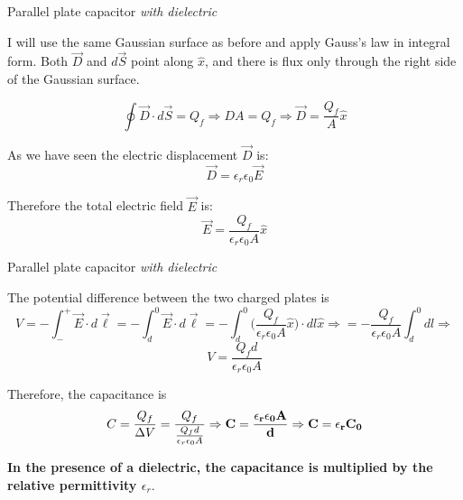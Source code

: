 %
%
%

\begin{frame}{Parallel plate capacitor {\em with dielectric}}

I will use the same Gaussian surface as before and apply Gauss's law in integral form.
Both $\vec{D}$ and $d\vec{S}$ point along $\hat{x}$,
and there is flux only through the right side of the Gaussian surface.

\begin{equation*}
   \oint \vec{D} \cdot d\vec{S} = Q_{f} \Rightarrow D A = Q_{f} \Rightarrow \vec{D} = \frac{Q_{f}}{A} \hat{x}
\end{equation*}

As we have seen the electric displacement $\vec{D}$ is:
\begin{equation*}
   \vec{D} = \epsilon_{r} \epsilon_{0} \vec{E}
\end{equation*}

Therefore the total electric field $\vec{E}$ is:
\begin{equation*}
   \vec{E} = \frac{Q_{f}}{\epsilon_{r} \epsilon_{0} A} \hat{x}
\end{equation*}

\end{frame}

%
%
%

\begin{frame}{Parallel plate capacitor {\em with dielectric}}

The potential difference between the two charged plates is
\begin{equation*}
    V = - \int_{-}^{+} \vec{E} \cdot d\vec{\ell} =  - \int_{d}^{0} \vec{E} \cdot d\vec{\ell}
      = - \int_{d}^{0} \Big( \frac{Q_{f}}{\epsilon_{r} \epsilon_{0} A} \hat{x} \Big) \cdot dl \hat{x} \Rightarrow
      = - \frac{Q_{f}}{\epsilon_{r} \epsilon_{0} A} \int_{d}^{0} dl \Rightarrow
\end{equation*}
\begin{equation*}
    V = \frac{Q_{f} d}{\epsilon_{r} \epsilon_{0} A}
\end{equation*}

Therefore, the capacitance is
\begin{equation*}
       C = \frac{Q_{f}}{{\Delta}V} = \frac{Q_{f}}{\frac{Q_{f} d}{\epsilon_{r} \epsilon_{0} A}} \Rightarrow
  {\bf C = \frac{\epsilon_{r} \epsilon_{0} A}{d} } \Rightarrow
  {\bf C = \epsilon_{r} C_{0}}
\end{equation*}

{\bf In the presence of a dielectric,
the capacitance is multiplied by the relative permittivity $\epsilon_{r}$}.\\

\end{frame}


